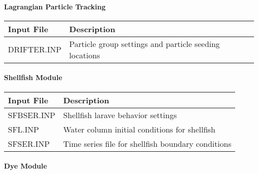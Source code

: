 \documentclass[letterpaper,10pt,english]{sphinxmanual}
\begin{document}
\paragraph{Lagrangian Particle Tracking}
\label{\detokenize{inputfiles/general_transport/lagrangian:lagrangian-particle-tracking}}\label{\detokenize{inputfiles/general_transport/lagrangian:lagrangian}}\label{\detokenize{inputfiles/general_transport/lagrangian::doc}}

\begin{savenotes}\sphinxattablestart
\centering
\begin{tabulary}{\linewidth}[t]{|T|T|}
\hline
\sphinxstyletheadfamily 
Input File
&\sphinxstyletheadfamily 
Description
\\
\hline
DRIFTER.INP
&
Particle group settings and particle seeding locations
\\
\hline
\end{tabulary}
\par
\sphinxattableend\end{savenotes}


\paragraph{Shellfish Module}
\label{\detokenize{inputfiles/general_transport/shellfish:shellfish-module}}\label{\detokenize{inputfiles/general_transport/shellfish:shellfish}}\label{\detokenize{inputfiles/general_transport/shellfish::doc}}

\begin{savenotes}\sphinxattablestart
\centering
\begin{tabulary}{\linewidth}[t]{|T|T|}
\hline
\sphinxstyletheadfamily 
Input File
&\sphinxstyletheadfamily 
Description
\\
\hline
SFBSER.INP
&
Shellfish larave behavior settings
\\
\hline
SFL.INP
&
Water column initial conditions for shellfish
\\
\hline
SFSER.INP
&
Time series file for shellfish boundary conditions
\\
\hline
\end{tabulary}
\par
\sphinxattableend\end{savenotes}


\paragraph{Dye Module}
\label{\detokenize{inputfiles/general_transport/dyes:dye-module}}\label{\detokenize{inputfiles/general_transport/dyes:dyes}}\label{\detokenize{inputfiles/general_transport/dyes::doc}}
\end{document}
